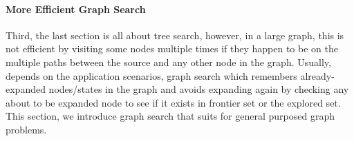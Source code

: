 \documentclass[../main.tex]{subfiles}
\begin{document}
\paragraph{More Efficient Graph Search}
Third, the last section is all about tree search, however, in a large graph, this is not efficient by visiting some nodes multiple times if they happen to be on the multiple paths between the source and any other node in the graph. Usually, depends on the application scenarios, graph search which remembers already-expanded nodes/states in the graph and avoids expanding again by checking any about to be expanded node to see if it exists in frontier set or the explored set. This section, we introduce graph search that suits for general purposed graph problems. 

\end{document}
